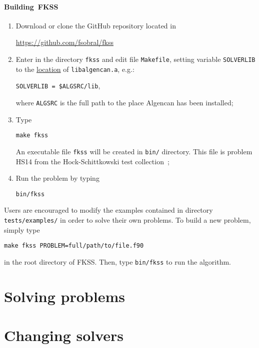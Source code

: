 \documentclass[a4paper,12pt]{article}
\newcommand{\fkss}{\textsc{FKSS}}
\begin{document}
\paragraph{Building~\fkss}
\begin{enumerate}
\item Download or clone the GitHub repository located in
  \begin{center}
    \url{https://github.com/fsobral/fkss}
  \end{center}
\item Enter in the directory \verb+fkss+ and edit file
  \verb+Makefile+, setting variable \verb+SOLVERLIB+ to the
  \underline{location} of \verb+libalgencan.a+, e.g.:
  \begin{center}
    \verb+SOLVERLIB = $ALGSRC/lib+,
  \end{center}
  where \verb+ALGSRC+ is the full path to the place Algencan has been
  installed;
\item Type
  \begin{center}
    \verb+make fkss+
  \end{center}
  An executable file \verb+fkss+ will be created in \verb+bin/+
  directory. This file is problem HS14 from the Hock-Schittkowski test
  collection~\cite{Hock1980};
\item Run the problem by typing
  \begin{center}
    \verb+bin/fkss+
  \end{center}
\end{enumerate}

Users are encouraged to modify the examples contained in directory
\verb+tests/examples/+ in order to solve their own problems. To build
a new problem, simply type
\begin{center}
  \verb+make fkss PROBLEM=full/path/to/file.f90+
\end{center}
in the root directory of \fkss. Then, type \verb+bin/fkss+ to run the
algorithm.

\section{Solving problems} \label{solving}

\section{Changing solvers} \label{solvers}



\end{document}
